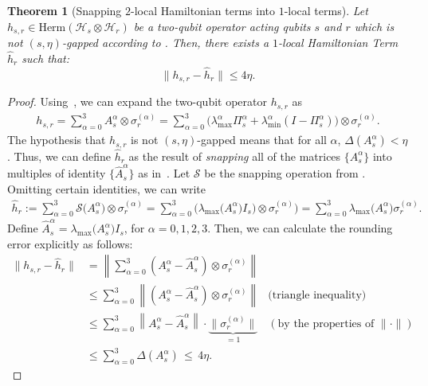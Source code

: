 \documentclass[a4paper,onecolumn,11pt]{quantumarticle}
\theoremstyle{plain}
\newtheorem{theorem}{Theorem}[section]
\begin{document}
\begin{theorem}[Snapping $2$-local Hamiltonian terms into $1$-local terms]
\label{thm:snapping-2-local-hamiltonian-term}
   Let $h_{s,r} \in \mathrm{Herm}(\mathcal{H}_s \otimes \mathcal{H}_r)$ be a two-qubit operator acting qubits $s$ and $r$ which is not $(s,\eta)$-gapped according to . Then, there exists a $1$-local Hamiltonian Term $\hat{h}_{r}$ such that:
    \begin{equation}
    \label{eqn:snapped-distance-between-hamiltonian-terms}
        \|h_{s,r} - \hat{h}_{r}\| \leq 4 \eta.
    \end{equation}
\end{theorem}
\begin{proof}
Using~, we can expand the two-qubit operator $h_{s,r}$ as
    \begin{align*}
        h_{s,r} = \sum\limits_{\alpha = 0}^{3} A_{s}^{\alpha} \otimes \sigma_{r}^{(\alpha)}
        = \sum\limits_{\alpha = 0}^{3} \Big(\lambda_{\max}^{\alpha} \Pi_{s}^{\alpha} + \lambda_{\min}^{\alpha} \left(I - \Pi_{s}^{\alpha}\right)\Big) \otimes \sigma_{r}^{(\alpha)}.
    \end{align*}
The hypothesis that $h_{s,r}$ is not $(s,\eta)$-gapped  means that for all $\alpha$, $\Delta(A_{s}^{\alpha}) < \eta$. Thus, we can define $\hat{h}_r$ as the result of \emph{snapping} all of the matrices $\{A_s^{\alpha}\}$ into multiples of identity $\{\hat{A}_s^{\alpha}\}$ as in~. Let $\mathcal{S}$ be the snapping operation from . Omitting certain identities, we can write
\begin{align}
    \hat{h}_r := \sum\limits_{\alpha = 0}^{3} \mathcal{S}\big(A_{s}^{\alpha}\big) \otimes \sigma_{r}^{(\alpha)}
    = \sum\limits_{\alpha = 0}^{3}  \big(\lambda_{\max}\big(A_{s}^{\alpha}\big)I_s\big) \otimes \sigma_{r}^{(\alpha)}\big) =\sum\limits_{\alpha = 0}^{3} \lambda_{\max}\big(A_{s}^{\alpha}\big)  \sigma_{r}^{(\alpha)}.
\end{align}
Define $\hat{A}_s^{\alpha} =\lambda_{\max}\big(A_{s}^{\alpha}\big) I_s$, for $\alpha=0,1,2,3$. Then, we can calculate the rounding error explicitly as follows:
\begin{align*}
    \|h_{s,r} - \hat{h}_{r}\| &= \left\|\sum\limits_{\alpha = 0}^{3} \left( A_s^{\alpha} - \hat{A}_s^{\alpha} \right)\otimes \sigma_{r}^{(\alpha)}\right\|\\
    &\leq \sum\limits_{\alpha = 0}^{3} \left\|\left( A_s^{\alpha} - \hat{A}_s^{\alpha} \right)\otimes \sigma_{r}^{(\alpha)} \right\| & \text{(triangle inequality)}\\
    &\leq \sum\limits_{\alpha = 0}^{3} \left\| A_s^{\alpha} - \hat{A}_s^{\alpha}  \right\| \cdot \underbrace{\| \sigma_r^{(\alpha)} \|}_{=1} & (\text{by the properties of } \|\cdot\|)\\
    &\leq \sum\limits_{\alpha = 0}^{3} \Delta(A_{s}^{\alpha}) \,\leq\, 4 \eta.
\end{align*}
\end{proof}
\end{document}
